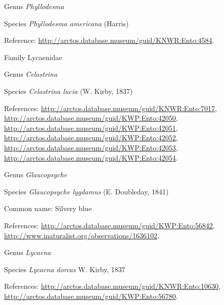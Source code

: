 \documentclass[9pt, article]{memoir}
\begin{document}
\begin{multicols}{2}
\vspace{6pt}\noindent\hspace{30pt}Genus \textit{Phyllodesma}


\vspace{6pt}\noindent\hspace{36pt}Species \textit{Phyllodesma americana} (Harris)


Reference: 
\url{http://arctos.database.museum/guid/KNWR:Ento:4584}.

\vspace{6pt}\noindent\hspace{24pt}Family Lycaenidae


\vspace{6pt}\noindent\hspace{30pt}Genus \textit{Celastrina}


\vspace{6pt}\noindent\hspace{36pt}Species \textit{Celastrina lucia} (W. Kirby, 1837)


References: 
\url{http://arctos.database.museum/guid/KNWR:Ento:7017}, 
\url{http://arctos.database.museum/guid/KWP:Ento:42050}, 
\url{http://arctos.database.museum/guid/KWP:Ento:42051}, 
\url{http://arctos.database.museum/guid/KWP:Ento:42052}, 
\url{http://arctos.database.museum/guid/KWP:Ento:42053}, 
\url{http://arctos.database.museum/guid/KWP:Ento:42054}.

\vspace{6pt}\noindent\hspace{30pt}Genus \textit{Glaucopsyche}


\vspace{6pt}\noindent\hspace{36pt}Species \textit{Glaucopsyche lygdamus} (E. Doubleday, 1841)


Common name: Silvery blue

References: 
\url{http://arctos.database.museum/guid/KWP:Ento:56842}, 
\url{http://www.inaturalist.org/observations/1636102}.

\vspace{6pt}\noindent\hspace{30pt}Genus \textit{Lycaena}


\vspace{6pt}\noindent\hspace{36pt}Species \textit{Lycaena dorcas} W. Kirby, 1837


References: 
\url{http://arctos.database.museum/guid/KNWR:Ento:10630}, 
\url{http://arctos.database.museum/guid/KWP:Ento:56780}.


\end{multicols}
\end{document}
